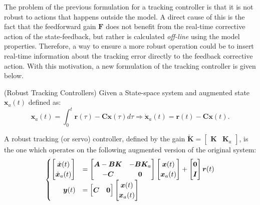 \documentclass[a4paper,11pt]{book}
\numberwithin{figure}{chapter}
\numberwithin{equation}{chapter}
\numberwithin{table}{chapter}
\theoremstyle{definition}
\newtheorem{definition}{Definition}[chapter]
\newcounter{boxed-theorem}
\newcounter{boxed-definition}
\newenvironment{boxed-definition}[1]
{\colorlet{shadecolor}{pastelYellow!15} \begin{shaded} \begin{definition}{#1}}
{\end{definition} \end{shaded}}
\newcounter{boxed-example}
\begin{document}
The problem of the previous formulation for a tracking controller is that it is not robust to actions that happens outside the model. A direct cause of this is the fact that the feedforward gain $\bm{F}$ does not benefit from the real-time corrective action of the state-feedback, but rather is calculated \textit{off-line} using the model properties. Therefore, a way to ensure a more robust operation could be to insert real-time information about the tracking error directly to the feedback corrective action. With this motivation, a new formulation of the tracking controller is given below.

\begin{boxed-definition}{(Robust Tracking Controllers)} \label{def:robustTracking}
    Given a State-space system and augmented state $\bm{x}_a(t)$ defined as:
    \begin{equation}
        \bm{x}_a(t) = \int_{0}^{t} \bm{r}(\tau) - \bm{C} \bm{x}(\tau) d\tau \Longrightarrow \dot{\bm{x}}_a(t) = \bm{r}(t) - \bm{C} \bm{x}(t)
    .\end{equation}
    
    A robust tracking (or servo) controller, defined by the gain $\tilde{\bm{K}} = \begin{bmatrix} \bm{K} & \bm{K}_a \end{bmatrix}$, is the one which operates on the following augmented version of the original system:
    \begin{align} \label{eq:augmentedSystem}
    \begin{cases}
        \begin{bmatrix}
            \dot{\bm{x}}(t) \\
            \dot{\bm{x}}_a(t)
        \end{bmatrix} &= \begin{bmatrix}
            \bm{A} - \bm{B} \bm{K} & -\bm{B} \bm{K}_a \\ - \bm{C} & \bm{0}
        \end{bmatrix} \begin{bmatrix}
            \bm{x}(t) \\
            \bm{x}_a(t)
        \end{bmatrix} + \begin{bmatrix}
            \bm{0} \\
            \bm{I}
        \end{bmatrix} \bm{r}(t)
        \\
        \hfill \bm{y}(t) &= \begin{bmatrix}
            \bm{C} & \bm{0}
        \end{bmatrix} \begin{bmatrix}
            \bm{x}(t) \\
            \bm{x}_a(t)
        \end{bmatrix}
    \end{cases}
    \end{align}
    

\end{boxed-definition}
\end{document}
